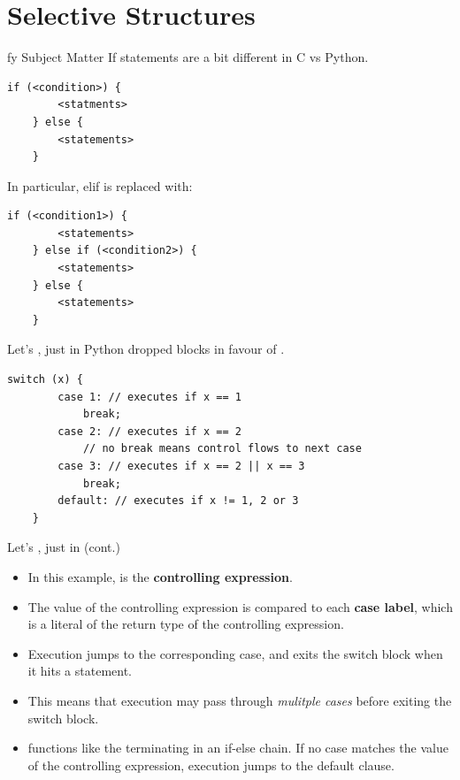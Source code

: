 \documentclass[11pt]{beamer}
\let\OldTexttt\texttt
\renewcommand{\texttt}[1]{\OldTexttt{\color{teal}{#1}}}
\begin{document}
\section[Branching]{Selective Structures}
\begin{frame}[fragile=singleslide]{\texttt{if}fy Subject Matter}
If statements are a bit different in C vs Python.
\begin{lstlisting}[style=C]
	if (<condition>) {
		<statments>
	} else {
		<statements>
	}
\end{lstlisting}
In particular, elif is replaced with:
\begin{lstlisting}[style=C]
	if (<condition1>) {
		<statements>
	} else if (<condition2>) {
		<statements>
	} else {
		<statements>
	}	
\end{lstlisting}
\end{frame}


\begin{frame}[fragile=singleslide]{Let's \texttt{switch}, just in \texttt{case}}
Python dropped \texttt{switch} blocks in favour of \texttt{elif}.
\begin{lstlisting}[style=C]
	switch (x) {
		case 1: // executes if x == 1
			break;
		case 2: // executes if x == 2
			// no break means control flows to next case
		case 3: // executes if x == 2 || x == 3
			break;
		default: // executes if x != 1, 2 or 3
	}	
\end{lstlisting}
\end{frame}

\begin{frame}{Let's \texttt{switch}, just in \texttt{case} (cont.)}
\begin{itemize} 
\item In this example, \texttt{x} is the \textbf{controlling expression}.
\item The value of the controlling expression is compared to each \textbf{case label}, which is a literal of the return type of the controlling expression.
\item Execution jumps to the corresponding case, and exits the switch block when it hits a \texttt{break} statement.
\item This means that execution may pass through \emph{mulitple cases} before exiting the switch block.
\item \texttt{default} functions like the terminating \texttt{else} in an if-else chain.  If no case matches the value of the controlling expression, execution jumps to the default clause. 
\end{itemize}
\end{frame}
\end{document}
